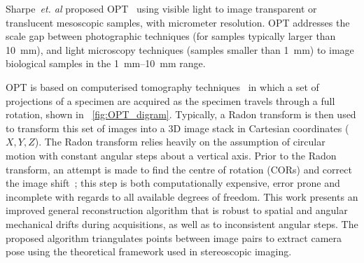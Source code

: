 \documentclass{osa-article}
\begin{document}
Sharpe~\emph{et. al} proposed OPT~\cite{sharpeOpticalProjectionTomography2002}
using visible light to image transparent or translucent mesoscopic samples, with micrometer resolution.
OPT addresses the scale gap between photographic techniques (for samples typically larger than \SI{10}{\milli\meter}), and light microscopy techniques (samples smaller than \SI{1}{\milli\meter}) to image biological samples in the \SIrange{1}{10}{\milli\meter} range.

OPT is based on computerised tomography techniques~\cite{kakPrinciplesComputerizedTomographic2001} in which a set of projections of a specimen are acquired as the specimen travels through a full rotation, shown in \figurename~\ref{fig:OPT_digram}.
Typically, a Radon transform is then used to transform this set of images into a 3D image stack in Cartesian coordinates (\( X,Y,Z \)).
The Radon transform relies heavily on the assumption of circular motion with constant angular steps about a vertical axis.
Prior to the Radon transform, an attempt is made to find the centre of rotation (CORs) and correct the image shift~\cite{dongAutomatedRecoveryCenter2013,arranzHelicalOpticalProjection2013,zhangZOPTOpenSource2020}; this step is both computationally expensive, error prone and incomplete with regards to all available degrees of freedom.
This work presents an improved general reconstruction algorithm that is robust to spatial and angular mechanical drifts during acquisitions, as well as to inconsistent angular steps.
The proposed algorithm triangulates points between image pairs to extract camera pose using the theoretical framework used in stereoscopic imaging. %
\end{document}
